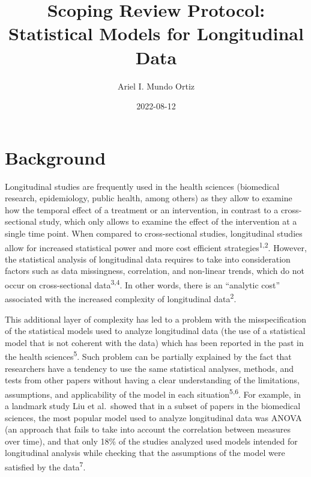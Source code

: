 \documentclass[
]{article}
\title{Scoping Review Protocol: Statistical Models for Longitudinal
Data}
\author{Ariel I. Mundo Ortiz}
\date{2022-08-12}
\renewcommand*\contentsname{Table of contents}
\newcommand\contentsname{Table of contents}
\begin{document}
\maketitle
\ifdefined\Shaded\renewenvironment{Shaded}{\begin{tcolorbox}[interior hidden, frame hidden, enhanced, boxrule=0pt, breakable, sharp corners, borderline west={3pt}{0pt}{shadecolor}]}{\end{tcolorbox}}\fi

\renewcommand*\contentsname{Table of contents}
{
\hypersetup{linkcolor=}
\setcounter{tocdepth}{3}
\tableofcontents
}
\hypertarget{background}{%
\section{Background}\label{background}}

Longitudinal studies are frequently used in the health sciences
(biomedical research, epidemiology, public health, among others) as they
allow to examine how the temporal effect of a treatment or an
intervention, in contrast to a cross-sectional study, which only allows
to examine the effect of the intervention at a single time point. When
compared to cross-sectional studies, longitudinal studies allow for
increased statistical power and more cost efficient
strategies\textsuperscript{1,2}. However, the statistical analysis of
longitudinal data requires to take into consideration factors such as
data missingness, correlation, and non-linear trends, which do not occur
on cross-sectional data\textsuperscript{3,4}. In other words, there is
an ``analytic cost'' associated with the increased complexity of
longitudinal data\textsuperscript{2}.

This additional layer of complexity has led to a problem with the
misspecification of the statistical models used to analyze longitudinal
data (the use of a statistical model that is not coherent with the data)
which has been reported in the past in the health
sciences\textsuperscript{5}. Such problem can be partially explained by
the fact that researchers have a tendency to use the same statistical
analyses, methods, and tests from other papers without having a clear
understanding of the limitations, assumptions, and applicability of the
model in each situation\textsuperscript{5,6}. For example, in a landmark
study Liu et al.~showed that in a subset of papers in the biomedical
sciences, the most popular model used to analyze longitudinal data was
ANOVA (an approach that fails to take into account the correlation
between measures over time), and that only 18\% of the studies analyzed
used models intended for longitudinal analysis while checking that the
assumptions of the model were satisfied by the data\textsuperscript{7}.
\end{document}
